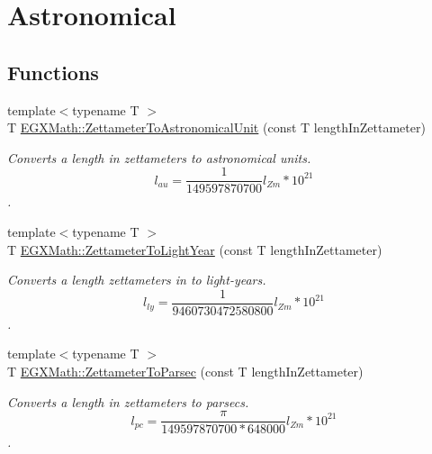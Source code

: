 \hypertarget{group___e_g_x_math-_conversions-_length_conversions-_s_i-_zettameter-_astronomical}{}\section{Astronomical}
\label{group___e_g_x_math-_conversions-_length_conversions-_s_i-_zettameter-_astronomical}
\subsection*{Functions}
\begin{DoxyCompactItemize}
\item 
{\footnotesize template$<$typename T $>$ }\\T \mbox{\hyperlink{group___e_g_x_math-_conversions-_length_conversions-_s_i-_zettameter-_astronomical_ga11b503418631f04db17ad979cef5403a}{E\+G\+X\+Math\+::\+Zettameter\+To\+Astronomical\+Unit}} (const T length\+In\+Zettameter)
\begin{DoxyCompactList}\small\item\em Converts a length in zettameters to astronomical units. \[ l_{au}= \frac{1}{149597870700} l_{Zm} * 10^{21} \]. \end{DoxyCompactList}\item 
{\footnotesize template$<$typename T $>$ }\\T \mbox{\hyperlink{group___e_g_x_math-_conversions-_length_conversions-_s_i-_zettameter-_astronomical_gacc76b416d7b6b3c4bd30cf8c5e924daf}{E\+G\+X\+Math\+::\+Zettameter\+To\+Light\+Year}} (const T length\+In\+Zettameter)
\begin{DoxyCompactList}\small\item\em Converts a length zettameters in to light-\/years. \[ l_{ly}= \frac{1}{9460730472580800} l_{Zm} * 10^{21} \]. \end{DoxyCompactList}\item 
{\footnotesize template$<$typename T $>$ }\\T \mbox{\hyperlink{group___e_g_x_math-_conversions-_length_conversions-_s_i-_zettameter-_astronomical_ga7924b0bc32c99624e84dcfb09806f730}{E\+G\+X\+Math\+::\+Zettameter\+To\+Parsec}} (const T length\+In\+Zettameter)
\begin{DoxyCompactList}\small\item\em Converts a length in zettameters to parsecs. \[ l_{pc}=\frac{\pi}{149597870700 * 648000} l_{Zm} * 10^{21} \]. \end{DoxyCompactList}\end{DoxyCompactItemize}


